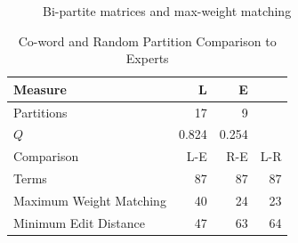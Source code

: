 \documentclass[a4paper, 11pt]{article}
\begin{document}
\begin{figure}[t!]
  \centering
  \hfill 
  \hfill 
  \hfill 
  \hfill 
  \caption{Bi-partite matrices and max-weight matching}\label{fig:bipartite}
\end{figure}

\begin{table}[t!]
  \centering
  \caption{Co-word and Random Partition Comparison to Experts}\label{tbl:comparison}
  \small
  \begin{tabular}{l r r r}
    \toprule
    Measure & L & E & \\
    \midrule
    Partitions & 17 & 9 & \\
    $Q$ & 0.824 & 0.254 & \\
    \midrule
    Comparison & L-E & R-E & L-R \\
    \midrule
    Terms & 87 & 87 & 87 \\
    Maximum Weight Matching & 40 & 24 & 23 \\
    Minimum Edit Distance & 47 & 63 & 64 \\
    \bottomrule
  \end{tabular}
\end{table}
\end{document}
